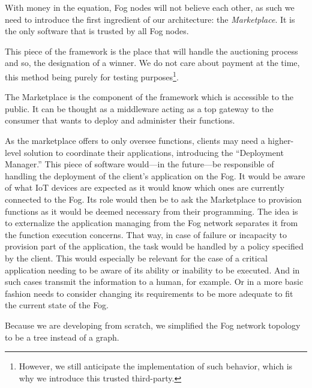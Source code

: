 \documentclass[11pt]{sdm}
\begin{document}
With money in the equation, Fog nodes will not believe each other, as such we need to introduce the first ingredient of our architecture: the \emph{Marketplace}. It is the only software that is trusted by all Fog nodes.

This piece of the framework is the place that will handle the auctioning process and so, the designation of a winner. We do not care about payment at the time, this method being purely for testing purposes\footnote{However, we still anticipate the implementation of such behavior, which is why we introduce this trusted third-party.}.

The Marketplace is the component of the framework which is accessible to the public. It can be thought as a middleware acting as a top gateway to the consumer that wants to deploy and administer their functions. 

As the marketplace offers to only oversee functions, clients may need a higher-level solution to coordinate their applications, introducing the “Deployment Manager.” This piece of software would—in the future—be responsible of handling the deployment of the client's application on the Fog. It would be aware of what \gls{IoT} devices are expected as it would know which ones are currently connected to the Fog. Its role would then be to ask the Marketplace to provision functions as it would be deemed necessary from their programming. The idea is to externalize the application managing from the Fog network separates it from the function execution concerns. That way, in case of failure or incapacity to provision part of the application, the task would be handled by a policy specified by the client. This would especially be relevant for the case of a critical application needing to be aware of its ability or inability to be executed. And in such cases transmit the information to a human, for example. Or in a more basic fashion needs to consider changing its requirements to be more adequate to fit the current state of the Fog.


Because we are developing from scratch, we simplified the Fog network topology to be a tree instead of a graph.
\end{document}
